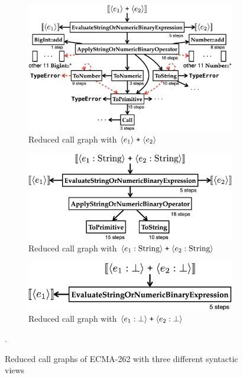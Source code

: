 \begin{figure}
  \centering
  \begin{minipage}[b]{\columnwidth}
    \begin{subfigure}[t]{\columnwidth}
      \centering
      \includegraphics[width=\textwidth]{img/add-basic.png}
      \caption{Reduced call graph with $\svhole{\expr_1} \; \code{+} \;
      \svhole{\expr_2}$}
    \end{subfigure}
  \end{minipage}
  \begin{minipage}[b]{\columnwidth}
    \begin{subfigure}[t]{\columnwidth}
      \centering
      \includegraphics[width=.8\textwidth]{img/add-str.png}
      \caption{Reduced call graph with $\svhole{\expr_1: \text{String}} \;
      \code{+} \; \svhole{\expr_2: \text{String}}$}
    \end{subfigure}
    \begin{subfigure}[t]{\columnwidth}
      \centering
      \includegraphics[width=.7\textwidth]{img/add-exc.png}
      \caption{Reduced call graph with $\svhole{\expr_1: \bot} \; \code{+} \;
      \svhole{\expr_2: \bot}$}
    \end{subfigure}
  \end{minipage}
  \caption{Reduced call graphs of ECMA-262 with three different syntactic views}
  \label{fig:add-graph}.
\end{figure}

